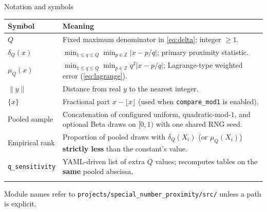 \documentclass[
  ignorenonframetext,
]{beamer}
\author{\texorpdfstring{}{}}
\date{}
\newcounter{none} %
\begin{document}
\begin{frame}[fragile]{Notation and symbols}
\protect{}\label{notation-and-symbols}
{\def\LTcaptype{none} %
\begin{longtable}[]{@{}
  >{\raggedright\arraybackslash}p{}
  >{\raggedright\arraybackslash}p{}@{}}
\toprule\noalign{}
\begin{minipage}[b]{\linewidth}\raggedright
Symbol
\end{minipage} & \begin{minipage}[b]{\linewidth}\raggedright
Meaning
\end{minipage} \\
\midrule\noalign{}
\endhead
\(Q\) & Fixed maximum denominator in \eqref{eq:delta}; integer
\(\geq 1\). \\
\(\delta_Q(x)\) & \(\min_{1\le q\le Q}\min_{p\in\mathbb{Z}} |x-p/q|\);
primary proximity statistic. \\
\(\mu_Q(x)\) & \(\min_{1\le q\le Q}\min_{p\in\mathbb{Z}} q^2|x-p/q|\);
Lagrange-type weighted error (\eqref{eq:lagrange}). \\
\(\|y\|\) & Distance from real \(y\) to the nearest integer. \\
\(\{x\}\) & Fractional part \(x-\lfloor x\rfloor\) (used when
\texttt{compare\_mod1} is enabled). \\
Pooled sample & Concatenation of configured uniform,
quadratic-mod-\(1\), and optional Beta draws on \([0,1)\) with one
shared RNG seed. \\
Empirical rank & Proportion of pooled draws with \(\delta_Q(X_i)\) (or
\(\mu_Q(X_i)\)) \textbf{strictly less} than the constant's value. \\
\texttt{q\_sensitivity} & YAML-driven list of extra \(Q\) values;
recomputes tables on the \textbf{same} pooled abscissa. \\
\bottomrule\noalign{}
\end{longtable}
}

Module names refer to \texttt{projects/special\_number\_proximity/src/}
unless a path is explicit.
\end{frame}
\end{document}
